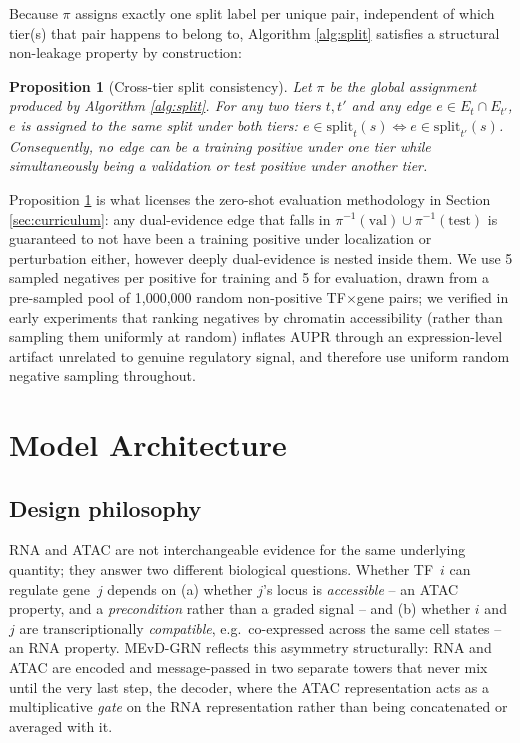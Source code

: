 \documentclass{article}
\theoremstyle{plain}
\newtheorem{proposition}{Proposition}[section]
\theoremstyle{definition}
\begin{document}
Because $\pi$ assigns exactly one split label per unique pair, independent of
which tier(s) that pair happens to belong to, Algorithm \ref{alg:split}
satisfies a structural non-leakage property by construction:

\begin{proposition}[Cross-tier split consistency]
\label{prop:split}
Let $\pi$ be the global assignment produced by Algorithm \ref{alg:split}. For
any two tiers $t, t'$ and any edge $e \in E_t \cap E_{t'}$, $e$ is assigned to
the \emph{same} split under both tiers: $e \in \mathrm{split}_t(s)
\Leftrightarrow e \in \mathrm{split}_{t'}(s)$. Consequently, no edge can be a
training positive under one tier while simultaneously being a validation or
test positive under another tier.
\end{proposition}

Proposition \ref{prop:split} is what licenses the zero-shot evaluation
methodology in Section \ref{sec:curriculum}: any dual-evidence edge that falls
in $\pi^{-1}(\text{val}) \cup \pi^{-1}(\text{test})$ is guaranteed to not have
been a training positive under localization or perturbation either, however
deeply dual-evidence is nested inside them. We use 5 sampled negatives per
positive for training and 5 for evaluation, drawn from a pre-sampled pool of
1{,}000{,}000 random non-positive TF$\times$gene pairs; we verified in early
experiments that ranking negatives by chromatin accessibility (rather than
sampling them uniformly at random) inflates AUPR through an expression-level
artifact unrelated to genuine regulatory signal, and therefore use uniform
random negative sampling throughout.

\section{Model Architecture}
\label{sec:model}

\subsection{Design philosophy}
RNA and ATAC are not interchangeable evidence for the same underlying quantity;
they answer two different biological questions. Whether TF~$i$ can regulate
gene~$j$ depends on (a) whether $j$'s locus is \emph{accessible} -- an ATAC
property, and a \emph{precondition} rather than a graded signal -- and (b)
whether $i$ and $j$ are transcriptionally \emph{compatible}, e.g.\ co-expressed
across the same cell states -- an RNA property. MEvD-GRN reflects this
asymmetry structurally: RNA and ATAC are encoded and message-passed in two
separate towers that never mix until the very last step, the decoder, where
the ATAC representation acts as a multiplicative \emph{gate} on the RNA
representation rather than being concatenated or averaged with it.
\end{document}

